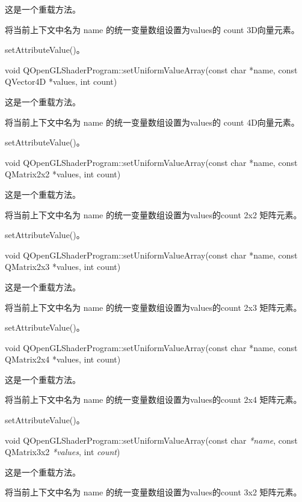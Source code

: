 这是一个重载方法。

将当前上下文中名为 name 的统一变量数组设置为values的 count 3D向量元素。

\begin{seeAlso}
setAttributeValue()。
\end{seeAlso}

void QOpenGLShaderProgram::setUniformValueArray(const char *name, const QVector4D *values, int count)

这是一个重载方法。

将当前上下文中名为 name 的统一变量数组设置为values的 count 4D向量元素。

\begin{seeAlso}
setAttributeValue()。
\end{seeAlso}

void QOpenGLShaderProgram::setUniformValueArray(const char *name, const QMatrix2x2 *values, int count)

这是一个重载方法。

将当前上下文中名为 name 的统一变量数组设置为values的count 2x2 矩阵元素。

\begin{seeAlso}
setAttributeValue()。
\end{seeAlso}

void QOpenGLShaderProgram::setUniformValueArray(const char *name, const QMatrix2x3 *values, int count)

这是一个重载方法。

将当前上下文中名为 name 的统一变量数组设置为values的count 2x3 矩阵元素。

\begin{seeAlso}
setAttributeValue()。
\end{seeAlso}

void QOpenGLShaderProgram::setUniformValueArray(const char *name, const QMatrix2x4 *values, int count)

这是一个重载方法。

将当前上下文中名为 name 的统一变量数组设置为values的count 2x4 矩阵元素。

\begin{seeAlso}
setAttributeValue()。
\end{seeAlso}

void QOpenGLShaderProgram::setUniformValueArray(const char \emph{*name}, const QMatrix3x2 \emph{*values}, int \emph{count})

这是一个重载方法。

将当前上下文中名为 name 的统一变量数组设置为values的count 3x2 矩阵元素。


